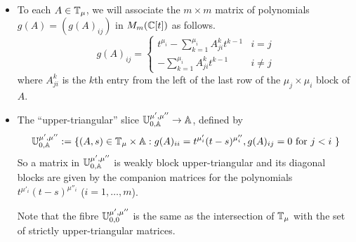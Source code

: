\documentclass[draft]{article}
\begin{document}
\begin{itemize}
    
    \item To each $ A \in \mathbb T_\mu$, we will associate the $m\times m$ matrix 
    of polynomials 
    $ g(A) = \left( g(A)_{ij} \right)$ in $ M_m(\mathbb C[t]) $ as follows.
    \begin{equation}
        \label{eq:mvyofa}
        g(A)_{ij} = 
    \begin{cases} t^{\mu_i} - \sum_{k=1}^{\mu_i} A^k_{ji} t^{k-1} & i = j \\
            - \sum_{k=1}^{\mu_i} A^k_{ji} t^{k-1} & i \ne j
    \end{cases}
    \end{equation}
    where $A^k_{ji}$ is the $k$th entry from the left of the last row of the $\mu_j\times\mu_i$ block of $A$. 

    
    \item The ``upper-triangular'' \mvy slice $\mathbb U^{\mu', \mu''}_{0,\mathbb A}\rightarrow \mathbb A $, defined by
    $$
    \mathbb U^{\mu', \mu''}_{0,\mathbb A} := \{ (A,s) \in \mathbb T_\mu \times \mathbb A : g(A)_{ii} = t^{\mu'_{i}} (t-s)^{\mu''_{i}}, g(A)_{ij} = 0 \text{ for $ j < i $ }\}
    $$
    So a matrix in $\mathbb U^{\mu', \mu''}_{0,\mathbb A}$ is weakly block upper-triangular and its diagonal blocks are given by the companion matrices for the polynomials $t^{\mu'_{i}} (t-s)^{\mu''_{i}}$ ($i=1,\dots,m$).
    
    Note that the fibre $  \mathbb U^{\mu', \mu''}_{0,0}$ is the same as the intersection of $ \mathbb T_\mu $ with the set of strictly upper-triangular matrices.


\end{itemize}
\end{document}
